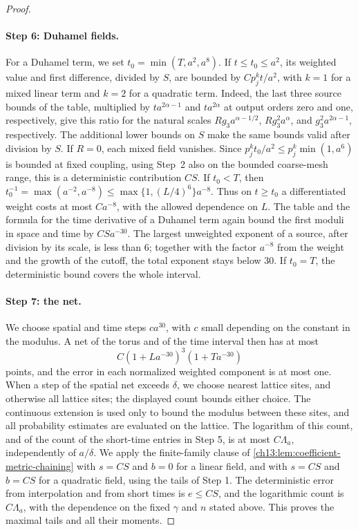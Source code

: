 \begin{proof}
\paragraph{Step 6: Duhamel fields.}
For a Duhamel term, we set $t_0=\min(T,a^2,a^8)$. If $t\le t_0\le a^2$, its weighted value and first difference, divided by $S$, are bounded by $Cp_j^kt/a^2$, with $k=1$ for a mixed linear term and $k=2$ for a quadratic term. Indeed, the last three source bounds of the table, multiplied by $ta^{2\alpha-1}$ and $ta^{2\alpha}$ at output orders zero and one, respectively, give this ratio for the natural scales $Rg_3a^{\alpha-1/2}$, $Rg_3^2a^\alpha$, and $g_3^2a^{2\alpha-1}$, respectively. The additional lower bounds on $S$ make the same bounds valid after division by $S$. If $R=0$, each mixed field vanishes. Since $p_j^k t_0/a^2\le p_j^k\min(1,a^6)$ is bounded at fixed coupling, using Step~2 also on the bounded coarse-mesh range, this is a deterministic contribution $CS$. If $t_0<T$, then $t_0^{-1}=\max(a^{-2},a^{-8})\le\max\{1,(L/4)^6\}a^{-8}$. Thus on $t\ge t_0$ a differentiated weight costs at most $Ca^{-8}$, with the allowed dependence on $L$. The table and the formula for the time derivative of a Duhamel term again bound the first moduli in space and time by $CSa^{-30}$. The largest unweighted exponent of a source, after division by its scale, is less than $6$; together with the factor $a^{-8}$ from the weight and the growth of the cutoff, the total exponent stays below $30$. If $t_0=T$, the deterministic bound covers the whole interval.

\paragraph{Step 7: the net.}
We choose spatial and time steps $ca^{30}$, with $c$ small depending on the constant in the modulus. A net of the torus and of the time interval then has at most
\[
 C(1+La^{-30})^3(1+Ta^{-30})
\]
points, and the error in each normalized weighted component is at most one. When a step of the spatial net exceeds $\delta$, we choose nearest lattice sites, and otherwise all lattice sites; the displayed count bounds either choice. The continuous extension is used only to bound the modulus between these sites, and all probability estimates are evaluated on the lattice. The logarithm of this count, and of the count of the short-time entries in Step 5, is at most $C\Lambda_a$, independently of $a/\delta$. We apply the finite-family clause of \cref{ch13:lem:coefficient-metric-chaining} with $s=CS$ and $b=0$ for a linear field, and with $s=CS$ and $b=CS$ for a quadratic field, using the tails of Step 1. The deterministic error from interpolation and from short times is $e\le CS$, and the logarithmic count is $C\Lambda_a$, with the dependence on the fixed $\gamma$ and $n$ stated above. This proves the maximal tails and all their moments.
\end{proof}

